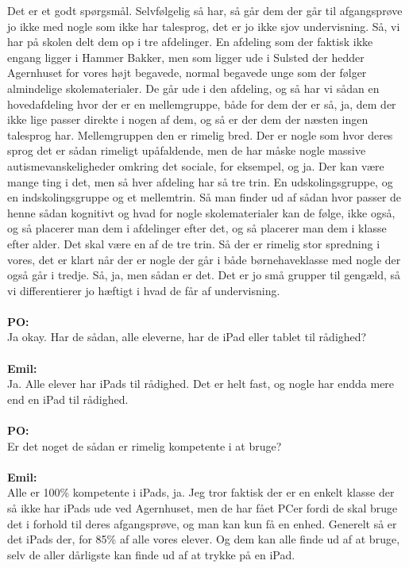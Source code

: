 Det er et godt spørgsmål.
Selvfølgelig så har, så går dem der går til afgangsprøve jo ikke med nogle som ikke har talesprog, det er jo ikke sjov undervisning.
Så, vi har på skolen delt dem op i tre afdelinger.
En afdeling som der faktisk ikke engang ligger i Hammer Bakker, men som ligger ude i Sulsted der hedder Agernhuset for vores højt begavede, normal begavede unge som der følger almindelige skolematerialer.
De går ude i den afdeling, og så har vi sådan en hovedafdeling hvor der er en mellemgruppe, både for dem der er så, ja, dem der ikke lige passer direkte i nogen af dem, og så er der dem der næsten ingen talesprog har.
Mellemgruppen den er rimelig bred. 
Der er nogle som hvor deres sprog det er sådan rimeligt upåfaldende, men de har måske nogle massive autismevanskeligheder omkring det sociale, for eksempel, og ja.
Der kan være mange ting i det, men så hver afdeling har så tre trin.
En udskolingsgruppe, og en indskolingsgruppe og et mellemtrin. 
Så man finder ud af sådan hvor passer de henne sådan kognitivt og hvad for nogle skolematerialer kan de følge, ikke også, og så placerer man dem i afdelinger efter det, og så placerer man dem i klasse efter alder.
Det skal være en af de tre trin. 
Så der er rimelig stor spredning i vores, det er klart når der er nogle der går i både børnehaveklasse med nogle der også går i tredje.
Så, ja, men sådan er det.
Det er jo små grupper til gengæld, så vi differentierer jo hæftigt i hvad de får af undervisning.
\\\\
\textbf{PO:}\\
Ja okay.
Har de sådan, alle eleverne, har de iPad eller tablet til rådighed?
\\\\
\textbf{Emil:}\\
Ja.
Alle elever har iPads til rådighed. 
Det er helt fast, og nogle har endda mere end en iPad til rådighed.
\\\\
\textbf{PO:}\\
Er det noget de sådan er rimelig kompetente i at bruge?
\\\\
\textbf{Emil:} \\
Alle er 100\% kompetente i iPads, ja.
Jeg tror faktisk der er en enkelt klasse der så ikke har iPads ude ved Agernhuset, men de har fået PCer fordi de skal bruge det i forhold til deres afgangsprøve, og man kan kun få en enhed.
Generelt så er det iPads der, for 85\% af alle vores elever. 
Og dem kan alle finde ud af at bruge, selv de aller dårligste kan finde ud af at trykke på en iPad.
